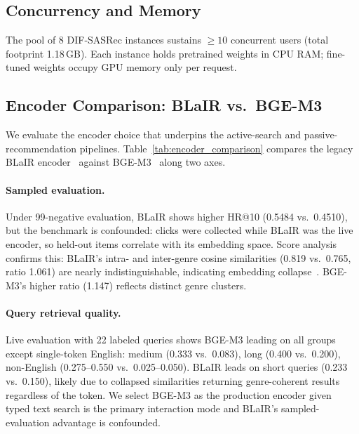 \subsection{Concurrency and Memory}
The pool of 8 DIF-SASRec instances sustains ${\geq}10$ concurrent users
(total footprint 1.18\,GB). Each instance holds pretrained weights in CPU
RAM; fine-tuned weights occupy GPU memory only per request.

\subsection{Encoder Comparison: BLaIR vs.\ BGE-M3}
\label{ssec:encoder}

We evaluate the encoder choice that underpins the active-search and
passive-recommendation pipelines.
Table~\ref{tab:encoder_comparison} compares the legacy BLaIR
encoder~\cite{hou2024amazon} against BGE-M3~\cite{chen2024bgem3} along two axes.


\paragraph{Sampled evaluation.}
Under 99-negative evaluation, BLaIR shows higher HR@10 (0.5484 vs.\ 0.4510),
but the benchmark is confounded: clicks were collected while BLaIR was
the live encoder, so held-out items correlate with its embedding space.
Score analysis confirms this: BLaIR's intra- and inter-genre cosine
similarities (0.819 vs.\ 0.765, ratio 1.061) are nearly indistinguishable,
indicating embedding collapse~\cite{gao2021simcse}. BGE-M3's higher ratio
(1.147) reflects distinct genre clusters.

\paragraph{Query retrieval quality.}
Live evaluation with 22 labeled queries shows BGE-M3 leading on all
groups except single-token English: medium (0.333 vs.\ 0.083), long
(0.400 vs.\ 0.200), non-English (0.275--0.550 vs.\ 0.025--0.050).
BLaIR leads on short queries (0.233 vs.\ 0.150), likely due to collapsed
similarities returning genre-coherent results regardless of the token.
We select BGE-M3 as the production encoder given typed text search
is the primary interaction mode and BLaIR's sampled-evaluation advantage
is confounded.
